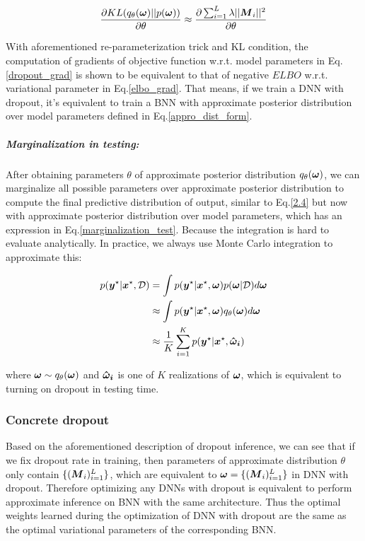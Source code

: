 \begin{equation} 
\begin{aligned}\label{KL_grad}
\frac{\partial KL(q_{\theta}(\boldsymbol \omega)||p(\boldsymbol \omega))}{\partial \theta} \approx \frac{\partial \sum_{i=1}^{L}\lambda||\boldsymbol M_{i}||^{2}}{\partial \theta}
\end{aligned}
\end{equation}

With aforementioned re-parameterization trick and KL condition, the computation of gradients of objective function w.r.t. model parameters in Eq.\ref{dropout_grad} is shown to be equivalent to that of negative $ELBO$ w.r.t. variational parameter in Eq.\ref{elbo_grad}. That means, if we train a DNN with dropout, it's equivalent to train a \gls{BNN} with approximate posterior distribution over model parameters defined in Eq.\ref{appro_dist_form}.

\subparagraph{Marginalization in testing:}
After obtaining parameters $\theta$ of approximate posterior distribution $q_{\theta}(\boldsymbol \omega)$, we can marginalize all possible parameters over approximate posterior distribution to compute the final predictive distribution of output, similar to Eq.\ref{2.4} but now with approximate posterior distribution over model parameters, which has an expression in Eq.\ref{marginalization_test}. Because the integration is hard to evaluate analytically. In practice, we always use Monte Carlo integration to approximate this:

\begin{equation}
\begin{aligned} \label{marginalization_test}
p(\boldsymbol y^{\star}| \boldsymbol x^{\star},\mathcal D) &= \int p(\boldsymbol y^{\star} | \boldsymbol x^{\star}, \boldsymbol \omega) p(\boldsymbol \omega |\mathcal D)d\boldsymbol \omega \\
&\approx \int p(\boldsymbol y^{\star} | \boldsymbol x^{\star}, \boldsymbol \omega) q_{\theta}(\boldsymbol \omega)d\boldsymbol \omega \\
&\approx \frac{1}{K}\sum_{i=1}^{K} p(\boldsymbol y^{\star} | \boldsymbol x^{\star}, \boldsymbol{\hat \omega_{i}}) 
\end{aligned}
\end{equation}

where $\boldsymbol \omega \sim q_{\theta}(\boldsymbol \omega)$ and $\boldsymbol{\hat \omega_{i}}$ is one of $K$ realizations of $\boldsymbol \omega$, which is equivalent to turning on dropout in testing time. 


\subsubsection{Concrete dropout}
Based on the aforementioned description of dropout inference, we can see that if we fix dropout rate in training, then parameters of approximate distribution $\theta$ only contain $\{(\boldsymbol M_{i})^L_{i=1}\}$, which are equivalent to $\boldsymbol \omega = \{(\boldsymbol M_{i})^L_{i=1}\}$ in DNN with dropout. Therefore optimizing any DNNs with dropout is equivalent to perform approximate inference on \gls{BNN} with the same architecture. Thus the optimal weights learned during the optimization of DNN with dropout are the same as the optimal variational parameters of the corresponding \gls{BNN}.

